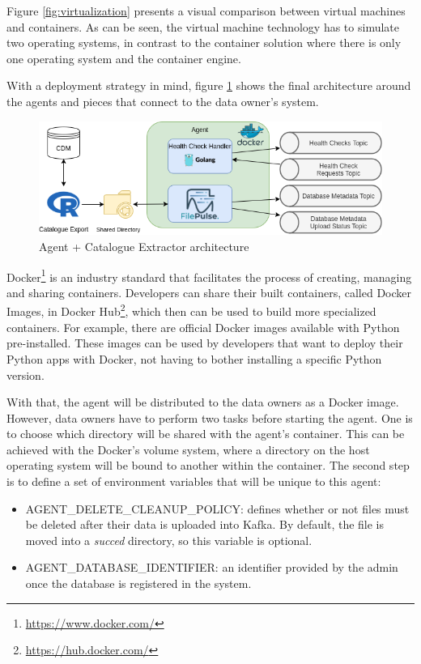 Figure \ref{fig:virtualization} presents a visual comparison between virtual machines and containers.
As can be seen, the virtual machine technology has to simulate two operating systems, in contrast to the container solution where there is only one operating system and the container engine.

With a deployment strategy in mind, figure \ref{fig:agent-architecture} shows the final architecture around the agents and pieces that connect to the data owner's system.

\begin{figure}[H]
    \center
    \includegraphics[width=\textwidth]{agent-architecture}
    \caption{Agent + Catalogue Extractor architecture}
    \label{fig:agent-architecture}
\end{figure}

Docker\footnote{\url{https://www.docker.com/}} is an industry standard that facilitates the process of creating, managing and sharing containers.
Developers can share their built containers, called Docker Images, in Docker Hub\footnote{\url{https://hub.docker.com/}}, which then can be used to build more specialized containers.
For example, there are official Docker images available with Python pre-installed. These images can be used by developers that want to deploy their Python apps with Docker, not having to bother installing a specific Python version.

With that, the agent will be distributed to the data owners as a Docker image.
However, data owners have to perform two tasks before starting the agent.
One is to choose which directory will be shared with the agent's container.
This can be achieved with the Docker's volume system, where a directory on the host operating system will be bound to another within the container.
The second step is to define a set of environment variables that will be unique to this agent:

\begin{itemize}
    \item AGENT\_DELETE\_CLEANUP\_POLICY: defines whether or not files must be deleted after their data is uploaded into Kafka.
        By default, the file is moved into a \textit{succed} directory, so this variable is optional.
    \item AGENT\_DATABASE\_IDENTIFIER: an identifier provided by the admin once the database is registered in the system.
\end{itemize}

